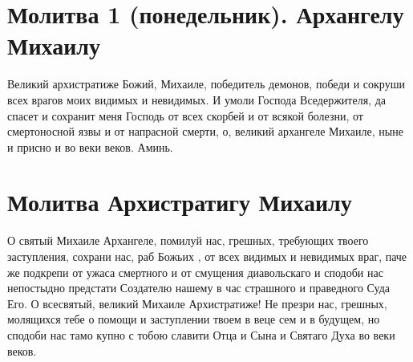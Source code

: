 

\label{_content_angelam-molitvi}





\section{Молитва 1 (понедельник). Архангелу Михаилу}\begin{mymulticols}


Великий архистратиже Божий, Михаиле, победитель демонов, победи и сокруши всех врагов моих видимых и невидимых. И умоли Господа Вседержителя, да спасет и сохранит меня Господь от всех скорбей и от всякой болезни, от смертоносной язвы и от напрасной смерти, о, великий архангеле Михаиле, ныне и присно и во веки веков. Аминь.


\end{mymulticols}

\section{Молитва Архистратигу Михаилу}\begin{mymulticols}



О святый Михаиле Архангеле, помилуй нас, грешных, требующих твоего заступления, сохрани нас, раб Божьих , от всех видимых и невидимых враг, паче же подкрепи от ужаса смертного и от смущения диавольскаго и сподоби нас непостыдно предстати Создателю нашему в час страшного и праведного Суда Его. О всесвятый, великий Михаиле Архистратиже! Не презри нас, грешных, молящихся тебе о помощи и заступлении твоем в веце сем и в будущем, но сподоби нас тамо купно с тобою славити Отца и Сына и Святаго Духа во веки веков.

\end{mymulticols}

\mychapterending





